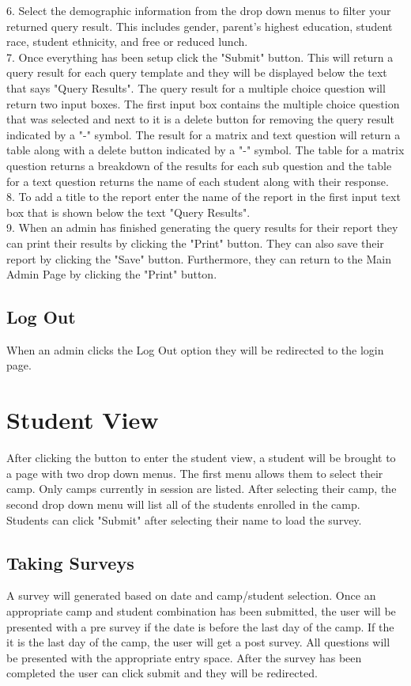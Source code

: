 \documentclass[letterpaper,10pt,serif, draftclsnofoot,onecolumn, compsoc, titlepage]{IEEEtran}
\begin{document}
6. Select the demographic information from the drop down menus to filter your returned query result.
This includes gender, parent's highest education, student race, student ethnicity, and free or reduced lunch.\\ 
7. Once everything has been setup click the "Submit" button.
This will return a query result for each query template and they will be displayed below the text that says "Query Results".
The query result for a multiple choice question will return two input boxes.
The first input box contains the multiple choice question that was selected and next to it is a delete button for removing the query result indicated by a "-" symbol.
The result for a matrix and text question will return a table along with a delete button indicated by a "-" symbol.
The table for a matrix question returns a breakdown of the results for each sub question and the table for a text question returns the name of each student along with their response.\\
8. To add a title to the report enter the name of the report in the first input text box that is shown below the text "Query Results".\\ 
9. When an admin has finished generating the query results for their report they can print their results by clicking the "Print" button.
They can also save their report by clicking the "Save" button.
Furthermore, they can return to the Main Admin Page by clicking the "Print" button.\\ 
\subsection{Log Out}
When an admin clicks the Log Out option they will be redirected to the login page. 
\section{Student View}
After clicking the button to enter the student view, a student will be brought to a page with two drop down menus.
The first menu allows them to select their camp.
Only camps currently in session are listed.
After selecting their camp, the second drop down menu will list all of the students enrolled in the camp.
Students can click "Submit" after selecting their name to load the survey.
\subsection{Taking Surveys}
A survey will generated based on date and camp/student selection. Once an appropriate camp and student combination 
has been submitted, the user will be presented with a pre survey if the date is before the last day of the camp. If 
the it is the last day of the camp, the user will get a post survey. All questions will be presented with the 
appropriate entry space. After the survey has been completed the user can click submit and they will be redirected.
\end{document}
